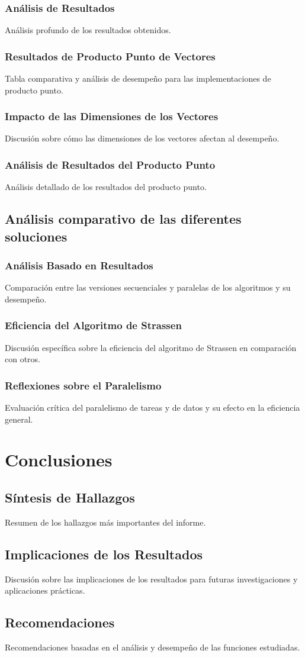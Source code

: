 \documentclass[12pt, a4paper]{article}
\begin{document}
\subsubsection{Análisis de Resultados}
Análisis profundo de los resultados obtenidos.

\subsubsection{Resultados de Producto Punto de Vectores}
Tabla comparativa y análisis de desempeño para las implementaciones de producto punto.
\subsubsection{Impacto de las Dimensiones de los Vectores}
Discusión sobre cómo las dimensiones de los vectores afectan al desempeño.
\subsubsection{Análisis de Resultados del Producto Punto}
Análisis detallado de los resultados del producto punto.

\subsection{Análisis comparativo de las diferentes soluciones}
\subsubsection{Análisis Basado en Resultados}
Comparación entre las versiones secuenciales y paralelas de los algoritmos y su desempeño.
\subsubsection{Eficiencia del Algoritmo de Strassen}
Discusión específica sobre la eficiencia del algoritmo de Strassen en comparación con otros.
\subsubsection{Reflexiones sobre el Paralelismo}
Evaluación crítica del paralelismo de tareas y de datos y su efecto en la eficiencia general.

\section{Conclusiones}
\subsection{Síntesis de Hallazgos}
Resumen de los hallazgos más importantes del informe.
\subsection{Implicaciones de los Resultados}
Discusión sobre las implicaciones de los resultados para futuras investigaciones y aplicaciones prácticas.
\subsection{Recomendaciones}
Recomendaciones basadas en el análisis y desempeño de las funciones estudiadas.
\end{document}
